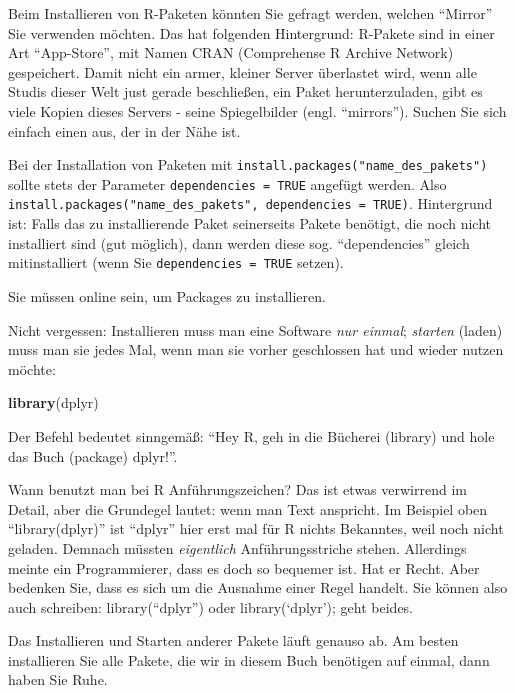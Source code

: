 \documentclass[12pt,ngerman,]{book}
\makeatletter
\newenvironment{Shaded}{\begin{snugshade}}{\end{snugshade}}
\newcommand{\KeywordTok}[1]{\textcolor[rgb]{0.13,0.29,0.53}{\textbf{{#1}}}}
\newcommand{\NormalTok}[1]{{#1}}
\newenvironment{kframe}{%
\medskip{}
\setlength{\fboxsep}{.8em}
 \def\at@end@of@kframe{}%
 \ifinner\ifhmode%
  \def\at@end@of@kframe{\end{minipage}}%
  \begin{minipage}{\columnwidth}%
 \fi\fi%
 \def\FrameCommand##1{\hskip\@totalleftmargin \hskip-\fboxsep
 \colorbox{shadecolor}{##1}\hskip-\fboxsep
     \hskip-\linewidth \hskip-\@totalleftmargin \hskip\columnwidth}%
 \MakeFramed {\advance\hsize-\width
   \@totalleftmargin\z@ \linewidth\hsize
   \@setminipage}}%
 {\par\unskip\endMakeFramed%
 \at@end@of@kframe}
\renewenvironment{Shaded}{\begin{kframe}}{\end{kframe}}
\let\BeginKnitrBlock\begin \let\EndKnitrBlock\end
\makeatother
\begin{document}
\BeginKnitrBlock{rmdcaution}
Beim Installieren von R-Paketen könnten Sie gefragt werden, welchen
``Mirror'' Sie verwenden möchten. Das hat folgenden Hintergrund:
R-Pakete sind in einer Art ``App-Store'', mit Namen CRAN (Comprehense R
Archive Network) gespeichert. Damit nicht ein armer, kleiner Server
überlastet wird, wenn alle Studis dieser Welt just gerade beschließen,
ein Paket herunterzuladen, gibt es viele Kopien dieses Servers - seine
Spiegelbilder (engl. ``mirrors''). Suchen Sie sich einfach einen aus,
der in der Nähe ist.
\EndKnitrBlock{rmdcaution}

Bei der Installation von Paketen mit
\texttt{install.packages("name\_des\_pakets")} sollte stets der
Parameter \texttt{dependencies\ =\ TRUE} angefügt werden. Also
\texttt{install.packages("name\_des\_pakets",\ dependencies\ =\ TRUE)}.
Hintergrund ist: Falls das zu installierende Paket seinerseits Pakete
benötigt, die noch nicht installiert sind (gut möglich), dann werden
diese sog. ``dependencies'' gleich mitinstalliert (wenn Sie
\texttt{dependencies\ =\ TRUE} setzen).

Sie müssen online sein, um Packages zu installieren.

Nicht vergessen: Installieren muss man eine Software \emph{nur einmal};
\emph{starten} (laden) muss man sie jedes Mal, wenn man sie vorher
geschlossen hat und wieder nutzen möchte:

\begin{Shaded}
\begin{Highlighting}[]
\KeywordTok{library}\NormalTok{(dplyr) }
\end{Highlighting}
\end{Shaded}

Der Befehl bedeutet sinngemäß: ``Hey R, geh in die Bücherei (library)
und hole das Buch (package) dplyr!''.

\BeginKnitrBlock{rmdcaution}
Wann benutzt man bei R Anführungszeichen? Das ist etwas verwirrend im
Detail, aber die Grundegel lautet: wenn man Text anspricht. Im Beispiel
oben ``library(dplyr)'' ist ``dplyr'' hier erst mal für R nichts
Bekanntes, weil noch nicht geladen. Demnach müssten \emph{eigentlich}
Anführungsstriche stehen. Allerdings meinte ein Programmierer, dass es
doch so bequemer ist. Hat er Recht. Aber bedenken Sie, dass es sich um
die Ausnahme einer Regel handelt. Sie können also auch schreiben:
library(``dplyr'') oder library(`dplyr'); geht beides.
\EndKnitrBlock{rmdcaution}

Das Installieren und Starten anderer Pakete läuft genauso ab. Am besten
installieren Sie alle Pakete, die wir in diesem Buch benötigen auf
einmal, dann haben Sie Ruhe.
\end{document}
